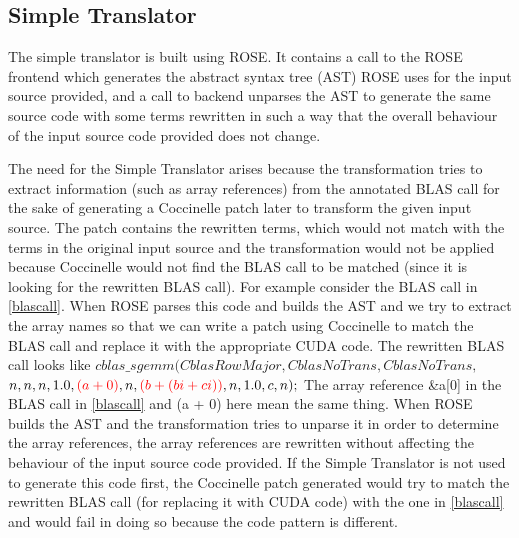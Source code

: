 \documentclass[12pt,a4paper]{article}
\begin{document}
\subsection{Simple Translator}
The simple translator is built using ROSE. It contains a call to the ROSE frontend which generates the abstract syntax tree (AST) ROSE uses for the input source provided, and a call to backend unparses the AST to generate the same source code with some terms rewritten in
such a way that the overall behaviour of the input source code provided does not change.

The need for the Simple Translator arises because the transformation tries to extract information (such as array references) from the annotated BLAS call for the sake of generating a Coccinelle patch later to transform the given input source. The patch contains the rewritten terms, which would not match with the terms in the original input source and the transformation would not be applied because Coccinelle would not find the BLAS call to be matched (since it is looking for the rewritten BLAS call). For example
consider the BLAS call in \ref{blascall}. When ROSE parses this code and builds the AST and
we try to extract the array names so that we can write a patch using Coccinelle to match
the BLAS call and replace it with the appropriate CUDA code. The rewritten BLAS call looks like \vspace{2ex} 
\newline $cblas\_sgemm(CblasRowMajor, CblasNoTrans, CblasNoTrans,$ 
\newline \hspace*{21mm} $ n, n, n, 1.0,{\color{red} (a + 0)},n,{\color{red} (b + (bi + ci))}, n,1.0,c,n);$ \vspace{2ex} 
\newline The array reference {\color{red} \&a[0]} in the BLAS call in \ref{blascall} and {\color{red} (a + 0)} here mean the same thing. When ROSE builds the AST and
the transformation tries to unparse it in order to determine the array references, the array references are rewritten without affecting the behaviour of the input source code provided. If the Simple Translator is not used to generate this code first, the Coccinelle patch generated would try to match the rewritten BLAS call (for replacing it with CUDA code) with the one in \ref{blascall} and would fail in doing so because the code pattern is different.
\end{document}
